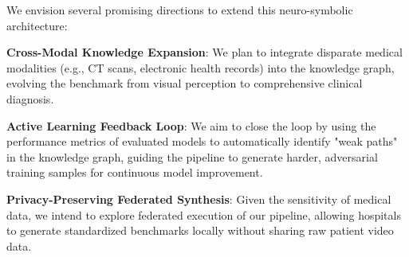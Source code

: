 We envision several promising directions to extend this neuro-symbolic architecture:

\textbf{Cross-Modal Knowledge Expansion}: We plan to integrate disparate medical modalities (e.g., CT scans, electronic health records) into the knowledge graph, evolving the benchmark from visual perception to comprehensive clinical diagnosis.

\textbf{Active Learning Feedback Loop}: We aim to close the loop by using the performance metrics of evaluated models to automatically identify "weak paths" in the knowledge graph, guiding the pipeline to generate harder, adversarial training samples for continuous model improvement.

\textbf{Privacy-Preserving Federated Synthesis}: Given the sensitivity of medical data, we intend to explore federated execution of our pipeline, allowing hospitals to generate standardized benchmarks locally without sharing raw patient video data.
